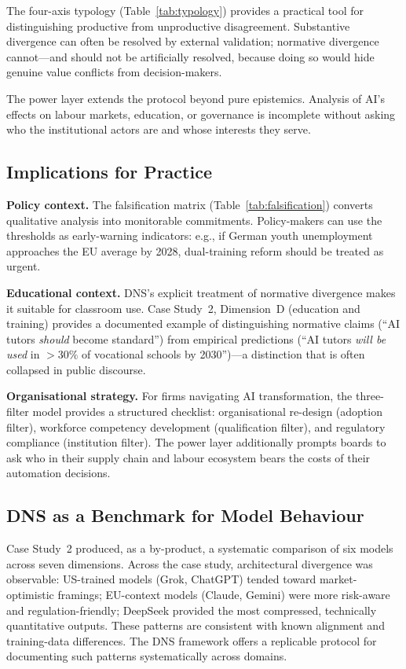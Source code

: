 \documentclass[10pt,a4paper]{article}
\begin{document}
The four-axis typology (Table~\ref{tab:typology}) provides a practical tool for
distinguishing productive from unproductive disagreement. Substantive divergence
can often be resolved by external validation; normative divergence cannot—and
should not be artificially resolved, because doing so would hide genuine value
conflicts from decision-makers.

The power layer extends the protocol beyond pure epistemics. Analysis of AI's
effects on labour markets, education, or governance is incomplete without asking
who the institutional actors are and whose interests they serve.

\subsection{Implications for Practice}
\textbf{Policy context.} The falsification matrix (Table~\ref{tab:falsification})
converts qualitative analysis into monitorable commitments. Policy-makers can
use the thresholds as early-warning indicators: e.g., if German youth unemployment
approaches the EU average by 2028, dual-training reform should be treated as
urgent.

\textbf{Educational context.} DNS's explicit treatment of normative divergence
makes it suitable for classroom use. Case Study~2, Dimension~D (education and
training) provides a documented example of distinguishing normative claims
(``AI tutors \textit{should} become standard'') from empirical predictions
(``AI tutors \textit{will be used} in $>30\%$ of vocational schools by 2030'')—a
distinction that is often collapsed in public discourse.

\textbf{Organisational strategy.} For firms navigating AI transformation, the
three-filter model provides a structured checklist: organisational re-design
(adoption filter), workforce competency development (qualification filter), and
regulatory compliance (institution filter). The power layer additionally prompts
boards to ask who in their supply chain and labour ecosystem bears the costs of
their automation decisions.

\subsection{DNS as a Benchmark for Model Behaviour}
Case Study~2 produced, as a by-product, a systematic comparison of six models
across seven dimensions. Across the case study, architectural divergence was
observable: US-trained models (Grok, ChatGPT) tended toward market-optimistic
framings; EU-context models (Claude, Gemini) were more risk-aware and
regulation-friendly; DeepSeek provided the most compressed, technically
quantitative outputs. These patterns are consistent with known alignment and
training-data differences. The DNS framework offers a replicable protocol for
documenting such patterns systematically across domains.
\end{document}
